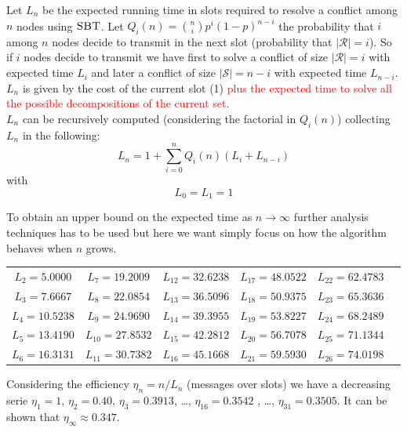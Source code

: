 \documentclass[12pt,a4paper,twocolumns]{report}
\newcommand{\algname}[1]{\ensuremath{\mbox{\sc #1}}}
\begin{document}
Let $L_{n}$ be the expected running time in slots required to resolve a conflict among $n$ nodes using \algname{SBT}.
Let $Q_{i}(n)={n\choose i} p^{i} (1-p)^{n-i}$ the probability that $i$ among $n$ nodes decide to transmit in the next slot (probability that $|\mathcal{R}|=i$). So if $i$ nodes decide to transmit we have first to solve a conflict of size $|\mathcal{R}|=i$ with expected time $L_{i}$ and later a conflict of size $|\mathcal{S}|=n-i$ with expected time $L_{n-i}$. $L_{n}$ is given by the cost of the current slot (1) \textcolor{red}{plus the expected time to solve all the possible decompositions of the current set}.\\
$L_{n}$ can be recursively computed (considering the factorial in $Q_{i}(n)$) collecting  $L_{n}$ in the following:
\begin{equation}
L_{n} = 1 + \sum_{i=0}^{n} Q_{i}(n) (L_{i}+L_{n-i})
\end{equation}
with
\begin{equation*}
L_{0} = L_{1}  = 1
\end{equation*}

To obtain an upper bound on the expected time as $ n \rightarrow \infty$ further analysis techniques has to be used but here we want simply focus on how the algorithm behaves when $n$ grows.\\

\begin{center}
\begin{tabular}{cccccc}
$L_{2} = 5.0000 $&$L_{7} = 19.2009 $  &$L_{12} = 32.6238 $  &$L_{17} = 48.0522 $  &$L_{22} = 62.4783 $ \\ 
$L_{3} = 7.6667 $&$L_{8} = 22.0854 $  &$L_{13} = 36.5096 $  &$L_{18} = 50.9375 $  &$L_{23} = 65.3636 $ \\ 
$L_{4} = 10.5238 $&$L_{9} = 24.9690 $  &$L_{14} = 39.3955 $  &$L_{19} = 53.8227 $  &$L_{24} = 68.2489 $ \\ 
$L_{5} = 13.4190 $&$L_{10} = 27.8532 $  &$L_{15} = 42.2812 $  &$L_{20} = 56.7078 $  &$L_{25} = 71.1344 $ \\  
$L_{6} = 16.3131 $&$L_{11} = 30.7382 $  &$L_{16} = 45.1668 $  &$L_{21} = 59.5930 $  &$L_{26} = 74.0198 $ \\  
\end{tabular} 
\end{center}


Considering the efficiency $\eta_{n}=n/L_{n}$ (messages over slots) we have a decreasing serie $\eta_{1}=1$, $\eta_{2}=0.40$, $\eta_{3}=0.3913$, \dots, $\eta_{16}=0.3542$ , \dots, $\eta_{31}=0.3505$. It can be shown \cite{capetanakis} that $\eta_{\infty} \approx 0.347$.\\
\end{document}
